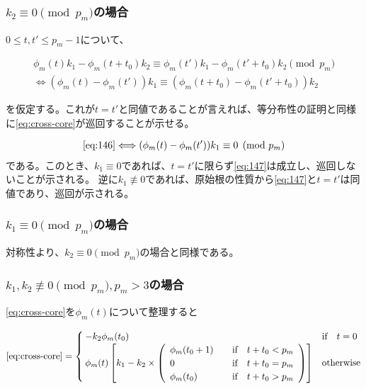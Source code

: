 \documentclass[platex]{jsarticle}
\begin{document}
\subsubsection{$k_2 \equiv 0 \pmod{p_m}$の場合}

$0 \leq t,t' \leq p_m-1$について、

\begin{gather}
\phi_m(t) k_1 - \phi_m(t+t_0) k_2 \equiv \phi_m(t') k_1 - \phi_m(t'+t_0) k_2 \pmod{p_m} \\
\Longleftrightarrow (\phi_m(t) -\phi_m(t')) k_1 \equiv (\phi_m(t+t_0) - \phi_m(t'+t_0)) k_2 \label{eq:146} 
\end{gather}

を仮定する。これが$t=t'$と同値であることが言えれば、等分布性の証明と同様に\eqref{eq:cross-core}が巡回することが示せる。

\begin{gather}
\eqref{eq:146} 
\Longleftrightarrow 
(\phi_m(t) -\phi_m(t')) k_1 \equiv 0 \pmod{p_m} \label{eq:147} 
\end{gather}
である。このとき、$k_1 \equiv 0$であれば、$t=t'$に限らず\eqref{eq:147}は成立し、巡回しないことが示される。
逆に$k_1 \not\equiv 0$であれば、原始根の性質から\eqref{eq:147}と$t=t'$は同値であり、巡回が示される。

\subsubsection{$k_1 \equiv 0 \pmod{p_m}$の場合}
対称性より、$k_2 \equiv 0 \pmod{p_m}$の場合と同様である。

\subsubsection{$k_1,k_2 \not\equiv 0 \pmod{p_m}, p_m > 3$の場合}

\eqref{eq:cross-core}を$\phi_m(t)$について整理すると

\begin{align}
\eqref{eq:cross-core}
= \begin{cases}
    -k_2\phi_m(t_0) & \text{if} \quad t = 0 \\
    \phi_m(t)  \left[ k_1 - k_2 \times
    \left( \begin{array}{ll}
        \phi_m(t_0+1) & \quad \text{if} \quad t+t_0 < p_m \\
        0  & \quad \text{if} \quad t+t_0 = p_m \\
        \phi_m(t_0) & \quad \text{if} \quad t+t_0 > p_m 
    \end{array} \right)
    \right] & \text{otherwise}
\end{cases}
\label{eq:expand}
\end{align}
\end{document}
